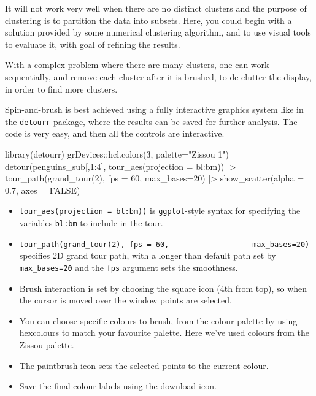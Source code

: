 \documentclass[
  letterpaper,
]{krantz}
\newenvironment{Shaded}{\begin{snugshade}}{\end{snugshade}}
\newcommand{\AttributeTok}[1]{\textcolor[rgb]{0.40,0.45,0.13}{#1}}
\newcommand{\ConstantTok}[1]{\textcolor[rgb]{0.56,0.35,0.01}{#1}}
\newcommand{\DecValTok}[1]{\textcolor[rgb]{0.68,0.00,0.00}{#1}}
\newcommand{\FloatTok}[1]{\textcolor[rgb]{0.68,0.00,0.00}{#1}}
\newcommand{\FunctionTok}[1]{\textcolor[rgb]{0.28,0.35,0.67}{#1}}
\newcommand{\NormalTok}[1]{\textcolor[rgb]{0.00,0.23,0.31}{#1}}
\newcommand{\SpecialCharTok}[1]{\textcolor[rgb]{0.37,0.37,0.37}{#1}}
\newcommand{\StringTok}[1]{\textcolor[rgb]{0.13,0.47,0.30}{#1}}
\providecommand{\tightlist}{%
  \setlength{\itemsep}{0pt}\setlength{\parskip}{0pt}}\usepackage{longtable,booktabs,array}
\begin{document}
It will not work very well when there are no distinct clusters and the
purpose of clustering is to partition the data into subsets. Here, you
could begin with a solution provided by some numerical clustering
algorithm, and to use visual tools to evaluate it, with goal of refining
the results.

With a complex problem where there are many clusters, one can work
sequentially, and remove each cluster after it is brushed, to de-clutter
the display, in order to find more clusters.

Spin-and-brush is best achieved using a fully interactive graphics
system like in the \texttt{detourr} package, where the results can be
saved for further analysis. The code is very easy, and then all the
controls are interactive.

\begin{Shaded}
\begin{Highlighting}[]
\FunctionTok{library}\NormalTok{(detourr)}
\NormalTok{grDevices}\SpecialCharTok{::}\FunctionTok{hcl.colors}\NormalTok{(}\DecValTok{3}\NormalTok{, }\AttributeTok{palette=}\StringTok{"Zissou 1"}\NormalTok{)}
\FunctionTok{detour}\NormalTok{(penguins\_sub[,}\DecValTok{1}\SpecialCharTok{:}\DecValTok{4}\NormalTok{], }
       \FunctionTok{tour\_aes}\NormalTok{(}\AttributeTok{projection =}\NormalTok{ bl}\SpecialCharTok{:}\NormalTok{bm)) }\SpecialCharTok{|\textgreater{}}
       \FunctionTok{tour\_path}\NormalTok{(}\FunctionTok{grand\_tour}\NormalTok{(}\DecValTok{2}\NormalTok{), }\AttributeTok{fps =} \DecValTok{60}\NormalTok{, }
                 \AttributeTok{max\_bases=}\DecValTok{20}\NormalTok{) }\SpecialCharTok{|\textgreater{}}
       \FunctionTok{show\_scatter}\NormalTok{(}\AttributeTok{alpha =} \FloatTok{0.7}\NormalTok{, }
                    \AttributeTok{axes =} \ConstantTok{FALSE}\NormalTok{)}
\end{Highlighting}
\end{Shaded}

\begin{itemize}
\tightlist
\item
  \texttt{tour\_aes(projection\ =\ bl:bm))} is \texttt{ggplot}-style
  syntax for specifying the variables \texttt{bl:bm} to include in the
  tour.
\item
  \texttt{tour\_path(grand\_tour(2),\ fps\ =\ 60,\ \ \ \ \ \ \ \ \ \ \ \ \ \ \ \ \ \ \ max\_bases=20)}
  specifies 2D grand tour path, with a longer than default path set by
  \texttt{max\_bases=20} and the \texttt{fps} argument sets the
  smoothness.
\item
  Brush interaction is set by choosing the square icon (4th from top),
  so when the cursor is moved over the window points are selected.
\item
  You can choose specific colours to brush, from the colour palette by
  using hexcolours to match your favourite palette. Here we've used
  colours from the Zissou palette.
\item
  The paintbrush icon sets the selected points to the current colour.
\item
  Save the final colour labels using the download icon.
\end{itemize}
\end{document}
